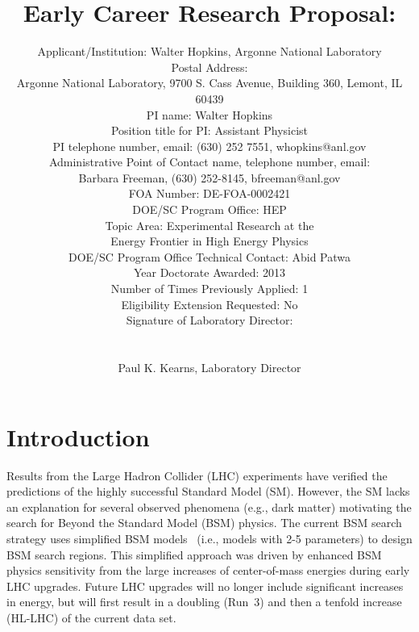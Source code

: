 \documentclass[letter, USenglish, 11pt, subfigure]{article}
\title{Early Career Research Proposal: \\}
\author{Applicant/Institution: Walter Hopkins, Argonne National Laboratory\\ Postal Address: \\Argonne National Laboratory, 9700 S. Cass Avenue, Building 360, Lemont, IL 60439
  \\PI name: Walter Hopkins\\Position title for PI: Assistant Physicist\\PI telephone number, email: (630) 252 7551, whopkins@anl.gov\\Administrative Point of Contact name, telephone number, email:\\Barbara Freeman, (630) 252-8145, bfreeman@anl.gov\\FOA Number: DE-FOA-0002421\\DOE/SC Program Office: HEP\\ Topic Area: Experimental Research at the \\Energy Frontier in High Energy Physics\\DOE/SC Program Office Technical Contact: Abid Patwa\\Year Doctorate Awarded: 2013\\Number of Times Previously Applied: 1\\Eligibility Extension Requested: No\\Signature of Laboratory Director: \\ \\ \\Paul K. Kearns, Laboratory Director
}
\date{}
\begin{document}
%

\clearpage
\tableofcontents
\clearpage
{} 




\section{Introduction}

Results from the Large Hadron Collider (LHC) experiments have verified the predictions of the highly successful Standard Model (SM). However, the SM  lacks an explanation for several observed phenomena (e.g., dark matter) motivating the search for Beyond the Standard Model (BSM) physics. The current BSM search strategy uses simplified BSM models~\cite{simpModels} (i.e., models with 2-5 parameters) to design BSM search regions. This simplified approach was driven by enhanced BSM physics sensitivity from the large increases of center-of-mass energies during early LHC upgrades. Future LHC upgrades will no longer include significant increases in energy, but will first result in a doubling (Run~3) and then a tenfold increase (HL-LHC) of the current data set.
\end{document}
